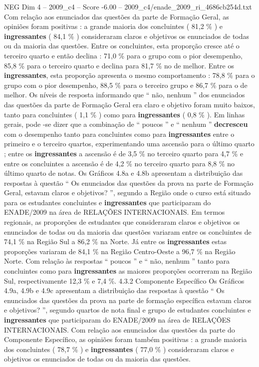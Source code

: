 \begin{textsample}{NEG Dim 4 – 2009\_c4 – Score -6.00 – 2009\_c4/enade\_2009\_ri\_4686cb254d.txt}
Com relação aos enunciados das questões da parte de Formação Geral, as opiniões foram positivas : a grande maioria dos concluintes ( 81,2 \% ) e \textbf{ingressantes} ( 84,1 \% ) consideraram claros e objetivos os enunciados de todas ou da maioria das questões.
Entre os concluintes, esta proporção cresce até o terceiro quarto e então declina : 71,0 \% para o grupo com o pior desempenho, 85,8 \% para o terceiro quarto e declina para 81,7 \% no de melhor.
Entre os \textbf{ingressantes}, esta proporção apresenta o mesmo comportamento : 78,8 \% para o grupo com o pior desempenho, 88,5 \% para o terceiro grupo e 86,7 \% para o de melhor.
Os níveis de resposta informando que “ não, nenhum ” dos enunciados das questões da parte de Formação Geral era claro e objetivo foram muito baixos, tanto para concluintes ( 1,1 \% ) como para \textbf{ingressantes} ( 0,8 \% ).
Em linhas gerais, pode -se dizer que a combinação de “ poucos ” e “ nenhum ” \textbf{decresceu} com o desempenho tanto para concluintes como para \textbf{ingressantes} entre o primeiro e o terceiro quartos, experimentando uma ascensão para o último quarto ; entre os \textbf{ingressantes} a ascensão é de 3,5 \% no terceiro quarto para 4,7 \% e entre os concluintes a ascensão é de 4,2 \% no terceiro quarto para 8,8 \% no último quarto de notas.
Os Gráficos 4.8a e 4.8b apresentam a distribuição das respostas à questão “ Os enunciados das questões da prova na parte de Formação Geral, estavam claros e objetivos? ”, segundo a Região onde o curso está situado para os estudantes concluintes e \textbf{ingressantes} que participaram do ENADE/2009 na área de RELAÇÕES INTERNACIONAIS.
Em termos regionais, as proporções de estudantes que consideraram claros e objetivos os enunciados de todas ou da maioria das questões variaram entre os concluintes de 74,1 \% na Região Sul a 86,2 \% na Norte.
Já entre os \textbf{ingressantes} estas proporções variaram de 84,1 \% na Região Centro-Oeste a 96,7 \% na Região Norte.
Com relação às respostas “ poucos ” e “ não, nenhum ” tanto para concluintes como para \textbf{ingressantes} as maiores proporções ocorreram na Região Sul, respectivamente 12,3 \% e 7,4 \%. 4.3.2 Componente Específico Os Gráficos 4.9a, 4.9b e 4.9c apresentam a distribuição das respostas à questão “ Os enunciados das questões da prova na parte de formação específica estavam claros e objetivos? ”, segundo quartos de nota final e grupo de estudantes concluintes e \textbf{ingressantes} que participaram do ENADE/2009 na área de RELAÇÕES INTERNACIONAIS.
Com relação aos enunciados das questões da parte do Componente Específico, as opiniões foram também positivas : a grande maioria dos concluintes ( 78,7 \% ) e \textbf{ingressantes} ( 77,0 \% ) consideraram claros e objetivos os enunciados de todas ou da maioria das questões.

\end{textsample}
